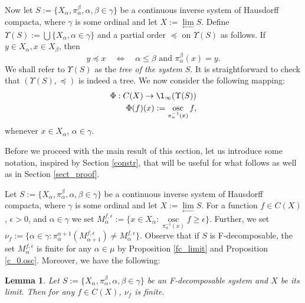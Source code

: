 \documentclass[11pt]{article}
\DeclareMathOperator{\osc}{osc}
\newtheorem{lemma}[theorem]{Lemma}
\theoremstyle{definition}
\theoremstyle{remark}
\begin{document}
Now let $S:= \{X_\alpha, \pi_\alpha^\beta, \alpha, \beta \in \gamma\}$ be a continuous inverse system of Hausdorff compacta, where $\gamma$ is some ordinal and let $X := \lim\limits_{\leftarrow} S$. Define $\Upsilon(S) := \bigcup \{X_\alpha, \alpha \in \gamma\}$ and a partial order $\preceq$ on $\Upsilon(S)$ as follows. If $y \in X_\alpha, x \in X_\beta$, then
\begin{equation*}
	y \preceq x \quad \iff \quad \alpha \leq \beta \text{ and } \pi_\alpha^\beta(x) = y.
\end{equation*}
We shall refer to $\Upsilon(S)$ as the \textit{tree of the system} $S$. It is straightforward to check that $(\Upsilon(S), \preceq)$ is indeed a tree. We now consider the following mapping:
\begin{align*}
	\Phi: C(X) \to \l_\infty(\Upsilon(S)) \\
	\Phi(f)(x) := \osc_{\pi_\alpha^{-1}(x)} f,
\end{align*}
whenever $x \in X_\alpha$, $\alpha \in \gamma$.

Before we proceed with the main result of this section, let us introduce some notation, inspired by Section \ref{constr}, that will be useful for what follows as well as in Section \ref{sect_proof}.

Let $S:= \{X_\alpha, \pi_\alpha^\beta, \alpha, \beta \in \gamma\}$ be a continuous inverse system of Hausdorff compacta, where $\gamma$ is some ordinal and let $X := \lim\limits_{\leftarrow} S$. For a function $f \in C(X)$, $\epsilon >0$, and $\alpha \in \gamma$ we set $M^{f, \epsilon}_\alpha := \{x \in X_\alpha: \osc\limits_{\pi_\alpha^{-1}(x)} f \geq \epsilon\}$. Further, we set $\nu_f := \{\alpha \in \gamma: \pi^{\alpha + 1}_\alpha(M^{f, \epsilon}_{\alpha+1}) \neq M^{f, \epsilon}_\alpha\}$. Observe that if $S$ is F-decomposable, the set $M^{f, \epsilon}_\alpha$ is finite for any $\alpha \in \mu$ by Proposition \ref{fc_limit} and Proposition \ref{c_0.osc}. Moreover, we have the following:

\begin{lemma} \label{finite_branching}
	Let $S:= \{X_\alpha, \pi_\alpha^\beta, \alpha, \beta \in \gamma\}$ be an F-decomposable system and $X$ be its limit. Then for any $f \in C(X)$,  $\nu_f$ is finite.
\end{lemma}
\end{document}
